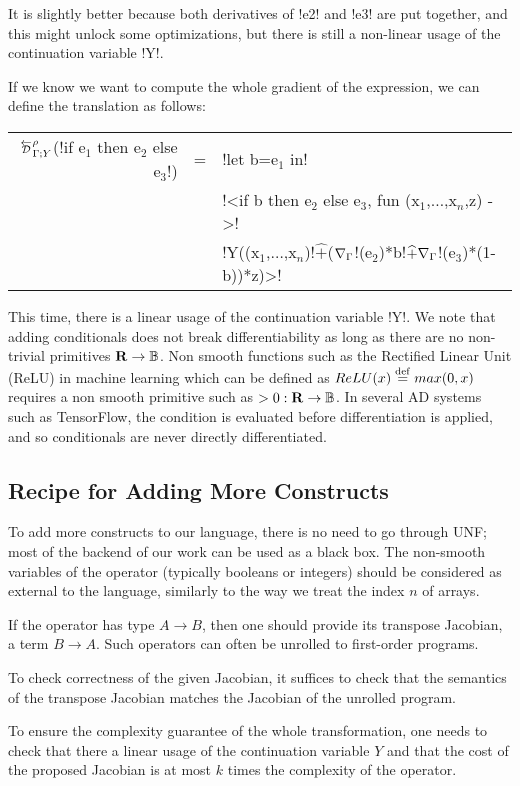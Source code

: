It is slightly better because both derivatives of !e2! and !e3! are put together, and this might unlock some optimizations, 
but there is still a non-linear usage of the continuation variable !Y!.

If we know we want to compute the whole gradient of the expression, we can define the translation as follows:

\begin{tabular}{r c l}
    $\directD{\rho}{\Gamma}{Y}$(!if e$_1$ then e$_2$ else e$_3$!) 
    &=& !let b=e$_1$ in!   \\
    && !<if b then e$_2$ else e$_3$, fun (x$_1$,$\ldots$,x$_n$,z) ->! \\
    && !Y((x$_1$,$\ldots$,x$_n$)!$\widehat{+}$($\nabla_\Gamma$!(e$_2$)*b!$\widehat{+}\nabla_\Gamma$!(e$_3$)*(1-b))*z)>!\\
\end{tabular}

This time, there is a linear usage of the continuation variable !Y!. We note that adding conditionals does not break differentiability as long as there are no non-trivial primitives $\mathbf{R}\to\mathbb{B}$.
Non smooth functions such as the Rectified Linear Unit (ReLU) in machine learning which can be defined as $ReLU(x)\stackrel {\mathrm{def}}= max(0,x)$ 
requires a non smooth primitive such as $>0: \mathbf{R}\to\mathbb{B}$. In several AD systems such as TensorFlow, 
the condition is evaluated before differentiation is applied, and so conditionals are never directly differentiated.

\subsection{Recipe for Adding More Constructs}
\label{sub:lift_recipe}
To add more constructs to our language, 
there is no need to go through UNF; most of the backend of our work can be used as a black box.
The non-smooth variables of the operator (typically booleans or integers) should be considered as external to the language, similarly to the way we treat the index $n$ of arrays.

If the operator has type $A\to B$, then one should provide its transpose Jacobian, a term $B\to A$. 
Such operators can often be unrolled to first-order programs. 

To check correctness of the given Jacobian, it suffices to 
check that the semantics of the transpose Jacobian matches the Jacobian of the unrolled program. 

To ensure the complexity guarantee of the whole transformation, one needs to check that there a linear usage of the continuation variable $Y$ and that the cost of the 
proposed Jacobian is at most $k$ times the complexity of the operator. 
